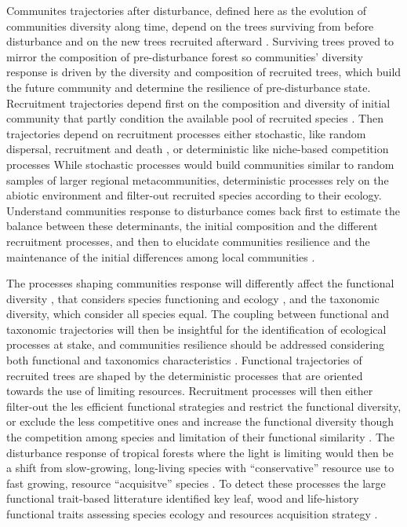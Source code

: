 \documentclass[fleqn,10pt]{ArtEcoFoG} %
\begin{document}
Communites trajectories after disturbance, defined here as the evolution
of communities diversity along time, depend on the trees surviving from
before disturbance and on the new trees recruited afterward
\citep{Herault2018}. Surviving trees proved to mirror the composition of
pre-disturbance forest so communities' diversity response is driven by
the diversity and composition of recruited trees, which build the future
community and determine the resilience of pre-disturbance state.
Recruitment trajectories depend first on the composition and diversity
of initial community that partly condition the available pool of
recruited species \citep{Herault2018}. Then trajectories depend on
recruitment processes either stochastic, like random dispersal,
recruitment and death \citep{Hubbell2001}, or deterministic like
niche-based competition processes \citep{Adler2007} While stochastic
processes would build communities similar to random samples of larger
regional metacommunities, deterministic processes rely on the abiotic
environment and filter-out recruited species according to their ecology.
Understand communities response to disturbance comes back first to
estimate the balance between these determinants, the initial composition
and the different recruitment processes, and then to elucidate
communities resilience and the maintenance of the initial differences
among local communities \citep{Diaz2005, Gardner2007, Schwartz2017}.

The processes shaping communities response will differently affect the
functional diversity \citep{Kunstler2016}, that considers species
functioning and ecology \citep{Violle2007}, and the taxonomic diversity,
which consider all species equal. The coupling between functional and
taxonomic trajectories will then be insightful for the identification of
ecological processes at stake, and communities resilience should be
addressed considering both functional and taxonomics characteristics
\citep{Fukami2005}. Functional trajectories of recruited trees are
shaped by the deterministic processes that are oriented towards the use
of limiting resources. Recruitment processes will then either filter-out
the les efficient functional strategies and restrict the functional
diversity, or exclude the less competitive ones and increase the
functional diversity though the competition among species and limitation
of their functional similarity \citep{Ackerly2003, McGill2006}. The
disturbance response of tropical forests where the light is limiting
would then be a shift from slow-growing, long-living species with
``conservative'' resource use to fast growing, resource ``acquisitve''
species \citep{Denslow1980, Molino2001, Bongers2009}. To detect these
processes the large functional trait-based litterature identified key
leaf, wood and life-history functional traits assessing species ecology
and resources acquisition strategy
\citep{Wright2004, Chave2009b, Herault2011}.
\end{document}
